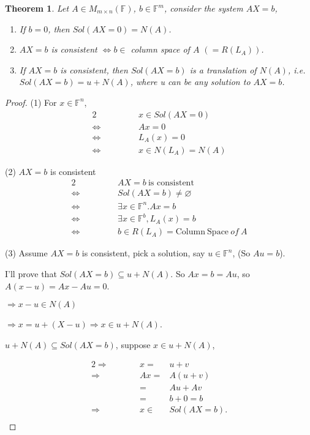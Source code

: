 \documentclass[12pt]{article}
\newtheorem{theorem}{Theorem}[subsection]
\newcommand{\ColSpace}{\mathrm{Column \ Space}}
\newcommand{\mF}{{\mathbb{F}}}
\begin{document}
\begin{theorem}
	Let $A \in M_{m\times n} (\mF)$, $b\in \mF^m$, consider the system $AX=b$,

	\begin{enumerate}
		\item If $b = 0$, then $Sol(AX = 0) = N(A)$.
		\item $AX = b$ is consistent $\Leftrightarrow b \in$ column space of 
			$A$ $(=R(L_A))$. 
		\item If $AX = b$ is consistent, then $Sol(AX=b)$ is a translation
			of $N(A)$, i.e. $Sol(AX=b) = u + N(A)$, where u can be any solution
			to $AX=b$. 
	\end{enumerate}
\end{theorem}
\begin{proof}
	(1) For $x \in \mF^n$,
	\begin{alignat*}{2}
		& & & x \in Sol(AX = 0) \\
		\Leftrightarrow & \qquad & &Ax = 0 \\
		\Leftrightarrow & \qquad & &L_A(x) = 0 \\
		\Leftrightarrow & \qquad & &x \in N(L_A) = N(A)
	\end{alignat*}
	
	(2) $AX = b$ is consistent 
	\begin{alignat*}{2}
		& & &AX = b \ \text{is consistent}	\\
		\Leftrightarrow & \qquad & & Sol(AX = b) \neq \varnothing	\\
		\Leftrightarrow & \qquad & & \exists x \in \mF^n. Ax = b	\\
		\Leftrightarrow & \qquad & & \exists x \in \mF^b, L_A(x) = b	\\
		\Leftrightarrow & \qquad & & b \in R(L_A) = \ColSpace \ of \ A	
	\end{alignat*}
	
	(3) Assume $AX = b$ is consistent, pick a solution, say $u \in \mF^n$, 
	(So $Au = b$). 

	I'll prove that $Sol(AX = b) \subseteq u + N(A)$. 
	So $Ax = b = Au$, so $A(x-u) = Ax - Au = 0$. 

	$\Rightarrow x - u \in N(A)$
	
	$\Rightarrow x = u + (X - u) \Rightarrow x \in u + N(A)$. 

	$u + N(A)\subseteq Sol(AX = b)$, suppose $x \in u + N(A)$, 

	\begin{alignat*}{2}
		\Rightarrow & \qquad & x =& u + v	\\
		\Rightarrow & \qquad & Ax =& A(u+v)	\\
					& &		=& Au + Av	\\
					& &		=& b + 0 = b	\\
		\Rightarrow & \qquad & x \in& Sol(AX=b). \\
	\end{alignat*}
\end{proof}
\end{document}
